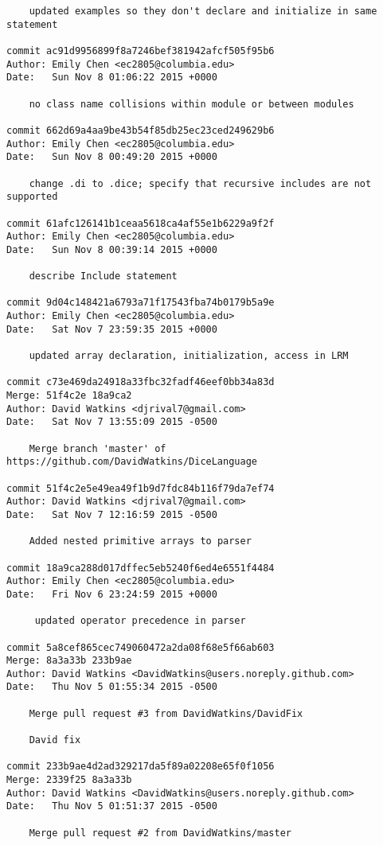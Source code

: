 \begin{verbatim}
    updated examples so they don't declare and initialize in same statement

commit ac91d9956899f8a7246bef381942afcf505f95b6
Author: Emily Chen <ec2805@columbia.edu>
Date:   Sun Nov 8 01:06:22 2015 +0000

    no class name collisions within module or between modules

commit 662d69a4aa9be43b54f85db25ec23ced249629b6
Author: Emily Chen <ec2805@columbia.edu>
Date:   Sun Nov 8 00:49:20 2015 +0000

    change .di to .dice; specify that recursive includes are not supported

commit 61afc126141b1ceaa5618ca4af55e1b6229a9f2f
Author: Emily Chen <ec2805@columbia.edu>
Date:   Sun Nov 8 00:39:14 2015 +0000

    describe Include statement

commit 9d04c148421a6793a71f17543fba74b0179b5a9e
Author: Emily Chen <ec2805@columbia.edu>
Date:   Sat Nov 7 23:59:35 2015 +0000

    updated array declaration, initialization, access in LRM

commit c73e469da24918a33fbc32fadf46eef0bb34a83d
Merge: 51f4c2e 18a9ca2
Author: David Watkins <djrival7@gmail.com>
Date:   Sat Nov 7 13:55:09 2015 -0500

    Merge branch 'master' of https://github.com/DavidWatkins/DiceLanguage

commit 51f4c2e5e49ea49f1b9d7fdc84b116f79da7ef74
Author: David Watkins <djrival7@gmail.com>
Date:   Sat Nov 7 12:16:59 2015 -0500

    Added nested primitive arrays to parser

commit 18a9ca288d017dffec5eb5240f6ed4e6551f4484
Author: Emily Chen <ec2805@columbia.edu>
Date:   Fri Nov 6 23:24:59 2015 +0000

     updated operator precedence in parser

commit 5a8cef865cec749060472a2da08f68e5f66ab603
Merge: 8a3a33b 233b9ae
Author: David Watkins <DavidWatkins@users.noreply.github.com>
Date:   Thu Nov 5 01:55:34 2015 -0500

    Merge pull request #3 from DavidWatkins/DavidFix
    
    David fix

commit 233b9ae4d2ad329217da5f89a02208e65f0f1056
Merge: 2339f25 8a3a33b
Author: David Watkins <DavidWatkins@users.noreply.github.com>
Date:   Thu Nov 5 01:51:37 2015 -0500

    Merge pull request #2 from DavidWatkins/master
    

\end{verbatim}
